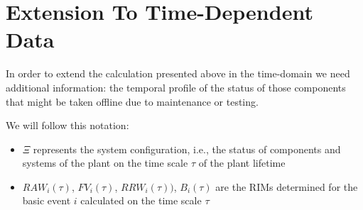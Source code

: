 \section{Extension To Time-Dependent Data}
\label{sec:timeDepRIMs}

In order to extend the calculation presented above in the time-domain we need 
additional information: the temporal profile of the status of those components 
that might be taken offline due to maintenance or testing.

We will follow this notation:
\begin{itemize}
  \item $\Xi$ represents the system configuration, i.e.,  the status of components 
              and systems of the plant on the time scale $\tau$ of the plant lifetime
  \item $RAW_i(\tau)$, $FV_i(\tau)$, $RRW_i(\tau))$, $B_i(\tau)$ are the RIMs determined 
        for the basic event $i$ calculated on the time scale $\tau$
\end{itemize}

